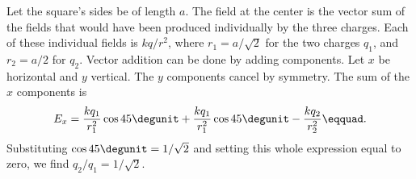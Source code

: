  Let the square's sides be of length $a$. The field at
the center is the vector sum of the fields that would have
been produced individually by the three charges. Each of
these individual fields is $kq/r^2$, where $r_1=a/\sqrt{2}$ for
the two charges $q_1$, and $r_2=a/2$ for $q_2$. Vector
addition can be done by adding components. Let $x$ be
horizontal and $y$ vertical. The $y$ components cancel by
symmetry. The sum of the $x$ components is
\begin{equation*}
		E_x	 =    \frac{kq_1}{r_1^2}\cos  45\degunit + \frac{kq_1}{r_1^2}\cos  45\degunit  - \frac{kq_2}{r_2^2}\eqquad.
\end{equation*}
Substituting $\cos 45\degunit=1/\sqrt{2}$ and setting this whole
expression equal to zero, we find $q_2/q_1=1/\sqrt{2}$.



